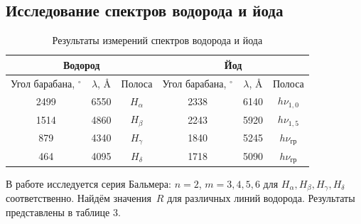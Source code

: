 \documentclass[a4paper]{article}
\begin{document}
\subsection{Исследование спектров водорода и йода}

\begin{table}[!ht]
    \centering
    \begin{tabular}{|ccc|ccc|}
    \hline
    \multicolumn{3}{|c|}{\cellcolor[HTML]{DEE6EF}Водород}                                     & \multicolumn{3}{c|}{\cellcolor[HTML]{DEE6EF}Йод}                                         \\ \hline
    \multicolumn{1}{|c|}{Угол барабана, $^\circ$} & \multicolumn{1}{c|}{$\lambda$, \r{A}} & Полоса & \multicolumn{1}{c|}{Угол барабана, $^\circ$} & \multicolumn{1}{c|}{$\lambda$, \r{A}} & Полоса \\ \hline
    \multicolumn{1}{|c|}{2499}                   & \multicolumn{1}{c|}{6550}         & $H_\alpha$  & \multicolumn{1}{c|}{2338}                   & \multicolumn{1}{c|}{6140}         & $h\nu_{1,0}$    \\ \hline
    \multicolumn{1}{|c|}{1514}                   & \multicolumn{1}{c|}{4860}         & $H_\beta$   & \multicolumn{1}{c|}{2243}                   & \multicolumn{1}{c|}{5920}         & $h\nu_{1,5}$    \\ \hline
    \multicolumn{1}{|c|}{879}                    & \multicolumn{1}{c|}{4340}         & $H_\gamma$  & \multicolumn{1}{c|}{1840}                   & \multicolumn{1}{c|}{5245}         & $h\nu_{\text{гр}}$      \\ \hline
    \multicolumn{1}{|c|}{464}                    & \multicolumn{1}{c|}{4095}         & $H_\delta$  & \multicolumn{1}{c|}{1718}                   & \multicolumn{1}{c|}{5090}         & $h\nu_{\text{гр}}$      \\ \hline
    \end{tabular}
    \caption{Результаты измерений спектров водорода и йода}
\end{table}

\noindent В работе исследуется серия Бальмера: $n = 2$, $m = 3, 4, 5, 6$ для $H_{\alpha}, H_{\beta}, H_{\gamma}, H_{\delta}$ соответственно. Найдём значения~$R$ для различных линий водорода. Результаты представлены в таблице 3.
\end{document}

